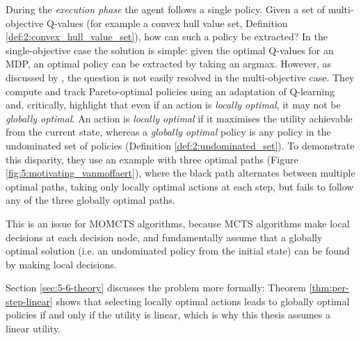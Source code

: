     During the \textit{execution phase} the agent follows a single policy. Given a set of multi-objective Q-values (for example a convex hull value set, Definition \ref{def:2:convex_hull_value_set}), how can such a policy be extracted? In the single-objective case the solution is simple: given the optimal Q-values for an MDP, an optimal policy can be extracted by taking an argmax. However, as discussed by \citet{locally_optimal}, the question is not easily resolved in the multi-objective case. They compute and track Pareto-optimal policies using an adaptation of Q-learning and, critically, highlight that even if an action is \textit{locally optimal}, it may not be \textit{globally optimal}. An action is \textit{locally optimal} if it maximises the utility achievable from the current state, whereas a \textit{globally optimal} policy is any policy in the undominated set of policies (Definition \ref{def:2:undominated_set}). To demonstrate this disparity, they use an example with three optimal paths (Figure \ref{fig:5:motivating_vanmoffaert}), where the black path alternates between multiple optimal paths, taking only locally optimal actions at each step, but fails to follow any of the three globally optimal paths.

    This is an issue for MOMCTS algorithms, because MCTS algorithms make local decisions at each decision node, and fundamentally assume that a globally optimal solution (i.e. an undominated policy from the initial state) can be found by making local decisions.

    Section \ref{sec:5-6-theory} discusses the problem more formally: Theorem \ref{thm:per-step-linear} shows that selecting locally optimal actions leads to globally optimal policies if and only if the utility is linear, which is why this thesis assumes a linear utility.


